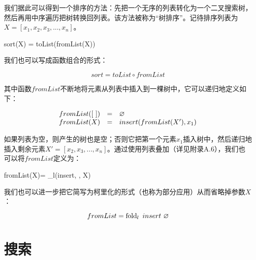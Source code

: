 \documentclass[b5paper]{ctexart}
\begin{document}
我们据此可以得到一个排序的方法：先把一个无序的列表转化为一个二叉搜索树，然后再用中序遍历把树转换回列表。该方法被称为“树排序”。记待排序列表为$X = [x_1, x_2, x_3, ..., x_n]$。

\be
  sort(X) = toList(fromList(X))
\ee

我们也可以写成函数组合\cite{func-composition}的形式：

\[
  sort = toList \circ fromList
\]

其中函数$fromList$不断地将元素从列表中插入到一棵树中，它可以递归地定义如下：

\[
\begin{array}{rcl}
fromList([\ ]) & = & \varnothing \\
fromList(X) & = & insert(fromList(X'), x_1) \\
\end{array}
\]

如果列表为空，则产生的树也是空；否则它把第一个元素$x_1$插入树中，然后递归地插入剩余元素$X' = [x_2, x_3, ..., x_n]$。通过使用列表叠加\cite{wiki-fold}（详见附录A.6），我们也可以将$fromList$定义为：

\be
  fromList(X)= \fold_l(insert, \nil, X)
\ee

我们也可以进一步把它简写为柯里化的形式\cite{curry}（也称为部分应用）从而省略掉参数$X$：

\[
  fromList = \fold_l\ insert\ \nil
\]

\begin{Exercise}



\end{Exercise}

\section{搜索}
\end{document}
